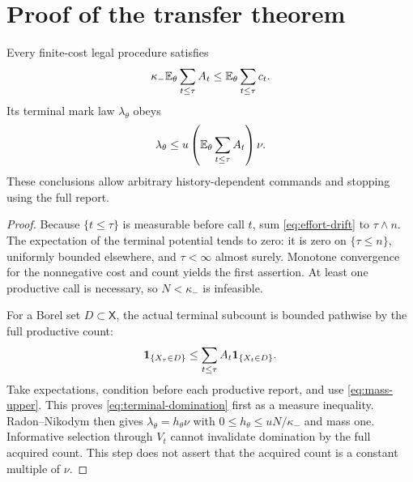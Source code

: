\section{Proof of the transfer theorem}
\begin{lemma}\label{lem:domination}
Every finite-cost legal procedure satisfies
\[
 \kappa_-\mathbb E_\theta\sum_{t\le\tau}A_t
 \le\mathbb E_\theta\sum_{t\le\tau}c_t.
\]
Its terminal mark law $\lambda_\theta$ obeys
\begin{equation}\label{eq:terminal-domination}
 \lambda_\theta\le u\left(\mathbb E_\theta\sum_{t\le\tau}A_t\right)\nu.
\end{equation}
These conclusions allow arbitrary history-dependent commands and stopping using the full report.
\end{lemma}
\begin{proof}
Because $\{t\le\tau\}$ is measurable before call $t$, sum \eqref{eq:effort-drift} to $\tau\wedge n$. The expectation of the terminal potential tends to zero: it is zero on $\{\tau\le n\}$, uniformly bounded elsewhere, and $\tau<\infty$ almost surely. Monotone convergence for the nonnegative cost and count yields the first assertion. At least one productive call is necessary, so $N<\kappa_-$ is infeasible.

For a Borel set $D\subset\mathsf X$, the actual terminal subcount is bounded pathwise by the full productive count:
\[
 \mathbf1_{\{X_\tau\in D\}}
 \le\sum_{t\le\tau}A_t\mathbf1_{\{X_t\in D\}}.
\]
Take expectations, condition before each productive report, and use \eqref{eq:mass-upper}. This proves \eqref{eq:terminal-domination} first as a measure inequality. Radon--Nikodym then gives $\lambda_\theta=h_\theta\nu$ with $0\le h_\theta\le uN/\kappa_-$ and mass one. Informative selection through $V_t$ cannot invalidate domination by the full acquired count. This step does not assert that the acquired count is a constant multiple of $\nu$.
\end{proof}

